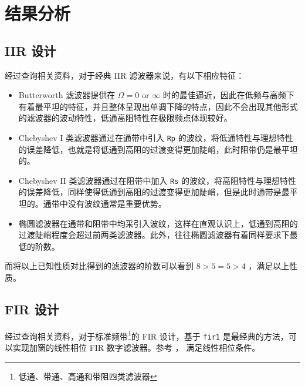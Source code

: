 \documentclass[lang=cn,11pt,a4paper,cite=authoryear]{elegantpaper}
\begin{document}

\section{结果分析}

\subsection{IIR 设计}

经过查询相关资料，对于经典 IIR 滤波器来说，有以下相应特征：

\begin{itemize}
    \item Butterworth 滤波器提供在 \(\Omega = 0 \text{ or } \infty\) 时的最佳逼近，因此在低频与高频下有着最平坦的特征，并且整体呈现出单调下降的特点，因此不会出现其他形式的滤波器的波动特性，低通高阻特性在极限频点体现较好。
    \item Chebyshev I 类滤波器通过在通带中引入 \lstinline{Rp} 的波纹，将低通特性与理想特性的误差降低，也就是将低通到高阻的过渡变得更加陡峭，此时阻带仍是最平坦的。
    \item Chebyshev II 类滤波器通过在阻带中加入 \lstinline{Rs} 的波纹，将高阻特性与理想特性的误差降低，同样使得低通到高阻的过渡变得更加陡峭，但是此时通带是最平坦的。通带中没有波纹通常是重要优势。
    \item 椭圆滤波器在通带和阻带中均采引入波纹，这样在直观认识上，低通到高阻的过渡陡峭程度会超过前两类滤波器。此外，往往椭圆滤波器有着同样要求下最低的阶数。
\end{itemize}

而将以上已知性质对比得到的滤波器的阶数可以看到 \(8 > 5 = 5 > 4\) ，满足以上性质。

\subsection{FIR 设计}

经过查询相关资料，对于标准频带\footnote{低通、带通、高通和带阻四类滤波器}的 FIR 设计，基于 \lstinline{fir1} 是最经典的方法，可以实现加窗的线性相位 FIR 数字滤波器。参考 ， 满足线性相位条件。

\end{document}
